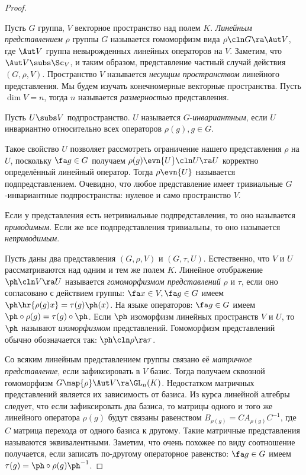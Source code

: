 \documentclass[a4paper]{article}
\begin{document}
\begin{proof}
\begin{df}
Пусть $G$ группа, $V$ векторное пространство над полем $K$.  \emph{Линейным представлением} $\rho$ группы
$G$ называется гомоморфизм вида $\rho\cln G \ra \Aut V$, где $\Aut V$ группа невырожденных линейных операторов
на $V$. Заметим, что $\Aut V \subs \Sc_V$, и таким образом, представление частный случай действия $(G,
\rho, V)$. Пространство $V$ называется \emph{несущим пространством} линейного представления. Мы будем изучать
конечномерные векторные пространства. Пусть $\dim V = n$, тогда $n$ называется \emph{размерностью}
представления.
\end{df}

\begin{df}
Пусть $U \subs V$ подпространство. $U$ называется $G$-\emph{инвариантным},  если $U$ инвариантно
относительно всех операторов $\rho(g), g \in G$.
\end{df}

Такое свойство $U$ позволяет рассмотреть ограничение нашего
представления $\rho$ на $U$, поскольку $\fa g \in G$ получаем $\rho(g)\evn{U}\cln U \ra U$ корректно
определённый линейный оператор. Тогда $\rho\evn{U}$ называется подпредставлением. Очевидно, что любое
представление имеет тривиальные $G$-инвариантные подпространства: нулевое и само пространство $V$.

\begin{df}
Если у представления есть нетривиальные подпредставления, то оно называется \emph{приводимым}. Если же
все подпредставления тривиальны, то оно называется \emph{неприводимым}.
\end{df}

\begin{df}
Пусть даны два представления $(G, \rho, V)$ и $(G, \tau, U)$. Естественно, что  $V$ и $U$ рассматриваются над
одним и тем же полем $K$. Линейное отображение $\ph\cln V \ra U$ называется \emph{гомоморфизмом представлений}
$\rho$ и $\tau$, если оно согласовано с действием группы: $\fa x \in V, \fa g \in G$ имеем
$\ph\hr{\rho(g)x}=\tau(g)\ph(x)$. На языке операторов: $\fa g \in G$ имеем $\ph \circ \rho(g) = \tau(g) \circ
\ph$. Если $\ph$ изоморфизм линейных пространств $V$ и $U$, то $\ph$ называют \emph{изоморфизмом}
представлений. Гомоморфизм представлений обычно обозначается так: $\ph\cln \rho \ra \tau$.
\end{df}

Со всяким линейным представлением группы связано её \emph{матричное представление},  если зафиксировать в $V$
базис. Тогда получаем сквозной гомоморфизм $G \map{\rho} \Aut V \ra \GL_n(K)$. Недостатком матричных
представлений является их зависимость от базиса. Из курса линейной алгебры следует, что если зафиксировать
два базиса, то матрицы одного и того же линейного оператора $\rho(g)$ будут связаны равенством
$B_{\rho(g)}=CA_{\rho(g)}C^{-1}$, где $C$ матрица перехода от одного базиса к другому. Такие матричные
представления называются эквивалентными. Заметим, что очень похожее по виду соотношение получается, если
записать по-другому операторное равенство: $\fa g \in G$ имеем $\tau(g)=\ph\circ\rho(g)\ph^{-1}$.


\end{proof}
\end{document}

